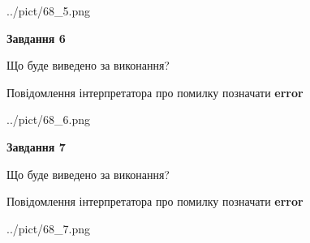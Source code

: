 \documentclass[10pt, ukrainian]{article}
\begin{document}
{\begin {large}
\begin{center}
	{../pict/68_5.png}
\end{center}
\newpage

{\begin {center}\textbf{Завдання 6}\end {center}}\par
Що буде виведено за виконання? \par
Повідомлення інтерпретатора про помилку позначати \textbf{error}

\begin{center}
	{../pict/68_6.png}
\end{center}
\newpage

{\begin {center}\textbf{Завдання 7}\end {center}}\par
Що буде виведено за виконання? \par
Повідомлення інтерпретатора про помилку позначати \textbf{error}

\begin{center}
	{../pict/68_7.png}
\end{center}
\newpage

\end {large}}
\end{document}
